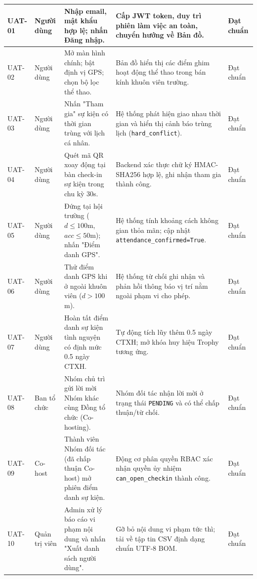 \begin{xltabular}{\textwidth}{|>{\centering\arraybackslash}p{1.4cm}|>{\raggedright\arraybackslash}p{1.8cm}|>{\raggedright\arraybackslash}X|>{\raggedright\arraybackslash}X|>{\centering\arraybackslash}p{1.6cm}|}
UAT-01 & Người dùng & Nhập email, mật khẩu hợp lệ; nhấn Đăng nhập. & Cấp JWT token, duy trì phiên làm việc an toàn, chuyển hướng về Bản đồ. & Đạt chuẩn \\ \hline
UAT-02 & Người dùng & Mở màn hình chính; bật định vị GPS; chọn bộ lọc thể thao. & Bản đồ hiển thị các điểm ghim hoạt động thể thao trong bán kính khuôn viên trường. & Đạt chuẩn \\ \hline
UAT-03 & Người dùng & Nhấn "Tham gia" sự kiện có thời gian trùng với lịch cá nhân. & Hệ thống phát hiện giao nhau thời gian và hiển thị cảnh báo trùng lịch (\texttt{hard\_conflict}). & Đạt chuẩn \\ \hline
UAT-04 & Người dùng & Quét mã QR xoay động tại bàn check-in sự kiện trong chu kỳ 30s. & Backend xác thực chữ ký HMAC-SHA256 hợp lệ, ghi nhận tham gia thành công. & Đạt chuẩn \\ \hline
UAT-05 & Người dùng & Đứng tại hội trường ($d \le 100$m, $acc \le 50$m); nhấn "Điểm danh GPS". & Hệ thống tính khoảng cách không gian thỏa mãn; cập nhật \texttt{attendance\_confirmed=True}. & Đạt chuẩn \\ \hline
UAT-06 & Người dùng & Thử điểm danh GPS khi ở ngoài khuôn viên ($d > 100$m). & Hệ thống từ chối ghi nhận và phản hồi thông báo vị trí nằm ngoài phạm vi cho phép. & Đạt chuẩn \\ \hline
UAT-07 & Người dùng & Hoàn tất điểm danh sự kiện tình nguyện có định mức 0.5 ngày CTXH. & Tự động tích lũy thêm 0.5 ngày CTXH; mở khóa huy hiệu Trophy tương ứng. & Đạt chuẩn \\ \hline
UAT-08 & Ban tổ chức & Nhóm chủ trì gửi lời mời Nhóm khác cùng Đồng tổ chức (Co-hosting). & Nhóm đối tác nhận lời mời ở trạng thái \texttt{PENDING} và có thể chấp thuận/từ chối. & Đạt chuẩn \\ \hline
UAT-09 & Co-host & Thành viên Nhóm đối tác (đã chấp thuận Co-host) mở phiên điểm danh sự kiện. & Động cơ phân quyền RBAC xác nhận quyền ủy nhiệm \texttt{can\_open\_checkin} thành công. & Đạt chuẩn \\ \hline
UAT-10 & Quản trị viên & Admin xử lý báo cáo vi phạm nội dung và nhấn "Xuất danh sách người dùng". & Gỡ bỏ nội dung vi phạm tức thì; tải về tập tin CSV định dạng chuẩn UTF-8 BOM. & Đạt chuẩn \\ \hline
\end{xltabular}
\endgroup
